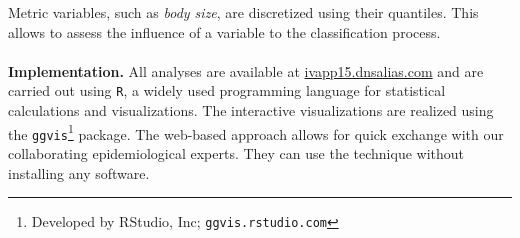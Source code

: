 \documentclass[a4paper,twoside]{style/article}
\begin{document}
Metric variables, such as \emph{body size}, are discretized using their quantiles.
This allows to assess the influence of a variable to the classification process.
\\\\
\noindent \textbf{Implementation.}
All analyses are available at \url{ivapp15.dnsalias.com} and are carried out using \texttt{R}, a widely used programming language for statistical calculations and visualizations.
The interactive visualizations are realized using the \texttt{ggvis}\footnote{Developed by RStudio, Inc; \texttt{ggvis.rstudio.com}} package.
The web-based approach allows for quick exchange with our collaborating epidemiological experts.
They can use the technique without installing any software.
\end{document}
